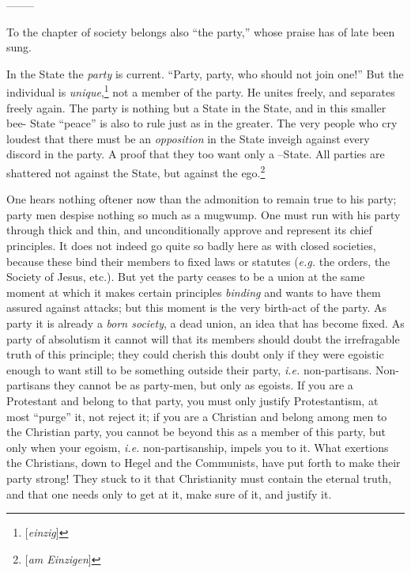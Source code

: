 \documentclass[12pt,a4paper]{book}
\begin{document}
\begin{center}
--------\end{center}


To the chapter of society belongs also ``the party,'' whose praise has of 
late been sung.

In the State the \textit{party} is current. ``Party, party, who should not 
join one!'' But the individual is 
\textit{unique},\footnote{[\textit{einzig}]} not a member of the party. He 
unites freely, and separates freely again. The party is nothing but a State in 
the State, and in this smaller bee- State ``peace'' is also to rule just as 
in the greater. The very people who cry loudest that there must be an 
\textit{opposition} in the State inveigh against every discord in the party. A 
proof that they too want only a --State. All parties are shattered not against 
the State, but against the ego.\footnote{[\textit{am Einzigen}]}

One hears nothing oftener now than the admonition to remain true to his party; 
party men despise nothing so much as a mugwump. One must run with his party 
through thick and thin, and unconditionally approve and represent its chief 
principles. It does not indeed go quite so badly here as with closed 
societies, because these bind their members to fixed laws or statutes 
(\textit{e.g.} the orders, the Society of Jesus, etc.). But yet the party 
ceases to be a union at the same moment at which it makes certain principles 
\textit{binding} and wants to have them assured against attacks; but this 
moment is the very birth-act of the party. As party it is already a 
\textit{born society}, a dead union, an idea that has become fixed. As party 
of absolutism it cannot will that its members should doubt the irrefragable 
truth of this principle; they could cherish this doubt only if they were 
egoistic enough to want still to be something outside their party, 
\textit{i.e.} non-partisans. Non-partisans they cannot be as party-men, but 
only as egoists. If you are a Protestant and belong to that party, you must 
only justify Protestantism, at most ``purge'' it, not reject it; if you are 
a Christian and belong among men to the Christian party, you cannot be beyond 
this as a member of this party, but only when your egoism, \textit{i.e.} 
non-partisanship, impels you to it. What exertions the Christians, down to 
Hegel and the Communists, have put forth to make their party strong! They 
stuck to it that Christianity must contain the eternal truth, and that one 
needs only to get at it, make sure of it, and justify it.
\end{document}
